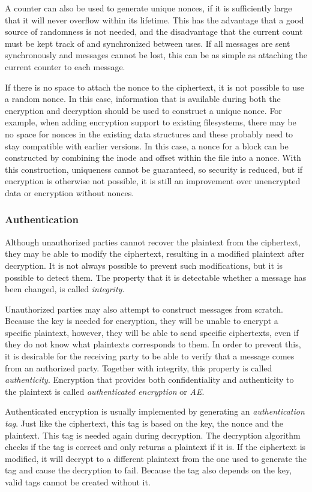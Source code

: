 A counter can also be used to generate unique nonces, if it is sufficiently
large that it will never overflow within its lifetime. This has the advantage
that a good source of randomness is not needed, and the disadvantage that the
current count must be kept track of and synchronized between uses. If all
messages are sent synchronously and messages cannot be lost, this can be as
simple as attaching the current counter to each message.

If there is no space to attach the nonce to the ciphertext, it is not possible
to use a random nonce. In this case, information that is available during both
the encryption and decryption should be used to construct a unique nonce. For
example, when adding encryption support to existing filesystems, there may be no
space for nonces in the existing data structures and these probably need to stay
compatible with earlier versions. In this case, a nonce for a block can be
constructed by combining the inode and offset within the file into a nonce. With
this construction, uniqueness cannot be guaranteed, so security is reduced, but
if encryption is otherwise not possible, it is still an improvement over
unencrypted data or encryption without nonces.

\subsubsection{Authentication}

Although unauthorized parties cannot recover the plaintext from the ciphertext,
they may be able to modify the ciphertext, resulting in a modified plaintext
after decryption. It is not always possible to prevent such modifications, but
it is possible to detect them. The property that it is detectable whether a
message has been changed, is called \emph{integrity}.

Unauthorized parties may also attempt to construct messages from scratch.
Because the key is needed for encryption, they will be unable to encrypt a
specific plaintext, however, they will be able to send specific ciphertexts,
even if they do not know what plaintexts corresponds to them. In order to
prevent this, it is desirable for the receiving party to be able to verify that
a message comes from an authorized party. Together with integrity, this property
is called \emph{authenticity}. Encryption that provides both confidentiality and
authenticity to the plaintext is called \emph{authenticated encryption} or
\emph{AE}.

Authenticated encryption is usually implemented by generating an
\emph{authentication tag}. Just like the ciphertext, this tag is based on the
key, the nonce and the plaintext. This tag is needed again during decryption.
The decryption algorithm checks if the tag is correct and only returns a
plaintext if it is. If the ciphertext is modified, it will decrypt to a
different plaintext from the one used to generate the tag and cause the
decryption to fail. Because the tag also depends on the key, valid tags cannot
be created without it.

